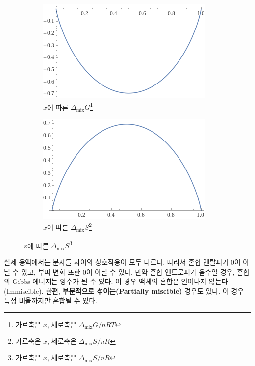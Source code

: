         \begin{figure}[H]
            \begin{subfigure}{0.5\textwidth}
                \includegraphics[width=0.9\linewidth]{Images/xlnx}
                \caption{$x$에 따른 $\Delta_\mathrm{mix}G$\footnote[1]{가로축은 $x$, 세로축은 $\Delta_\mathrm{mix}G/nRT$}}\label{f6a}
            \end{subfigure}
            \begin{subfigure}{0.5\textwidth}
                \includegraphics[width=0.9\linewidth]{Images/minusxlnx}
                \caption{$x$에 따른 $\Delta_\mathrm{mix}S$\footnote[2]{가로축은 $x$, 세로축은 $\Delta_\mathrm{mix}S/nR$}}\label{f6b}
            \end{subfigure}
        \end{figure}
        \par 실제 용액에서는 분자들 사이의 상호작용이 모두 다르다. 따라서 혼합 엔탈피가 0이 아닐 수 있고, 부피 변화 또한 0이 아닐 수 있다. 만약 
        혼합 엔트로피가 음수일 경우, 혼합의 Gibbs 에너지는 양수가 될 수 있다. 이 경우 액체의 혼합은 일어나지 않는다(Immiscible). 한편, 
        \textbf{부분적으로 섞이는(Partially miscible)} 경우도 있다. 이 경우 특정 비율까지만 혼합될 수 있다.
